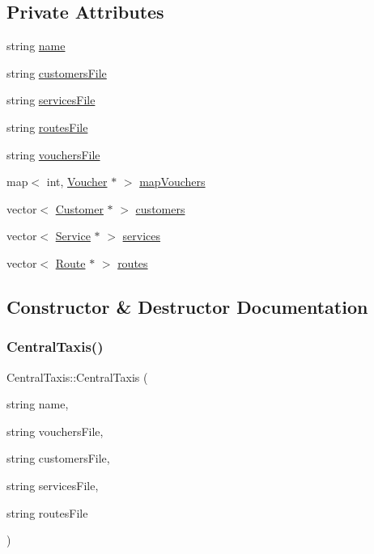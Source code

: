 \subsection*{Private Attributes}
\begin{DoxyCompactItemize}
\item 
string \hyperlink{classCentralTaxis_ab651d92a544bb7910586183aef0b5ff6}{name}
\item 
string \hyperlink{classCentralTaxis_a658c8ac7923a5f759da1545a21416532}{customers\+File}
\item 
string \hyperlink{classCentralTaxis_a0c57e6ffde520f8145edd96eb0e1fe22}{services\+File}
\item 
string \hyperlink{classCentralTaxis_af411ccf9a02306f4fb6343607ad9b751}{routes\+File}
\item 
string \hyperlink{classCentralTaxis_a6b4866b7ea58f6672dfab0677cc7a3ed}{vouchers\+File}
\item 
map$<$ int, \hyperlink{classVoucher}{Voucher} $\ast$ $>$ \hyperlink{classCentralTaxis_a3213a25703a7791fda679f93de0ff652}{map\+Vouchers}
\item 
vector$<$ \hyperlink{classCustomer}{Customer} $\ast$ $>$ \hyperlink{classCentralTaxis_a5418c7eb3c09a2037e4802630c53f5ee}{customers}
\item 
vector$<$ \hyperlink{classService}{Service} $\ast$ $>$ \hyperlink{classCentralTaxis_af5c916262a876770f184a31fff7203e5}{services}
\item 
vector$<$ \hyperlink{classRoute}{Route} $\ast$ $>$ \hyperlink{classCentralTaxis_aefebf92c6b447639524856f919b8736f}{routes}
\end{DoxyCompactItemize}


\subsection{Constructor \& Destructor Documentation}
\hypertarget{classCentralTaxis_aca0cca3a2df44dadf8bfcb71b3636739}{}\label{classCentralTaxis_aca0cca3a2df44dadf8bfcb71b3636739} 
\subsubsection{\texorpdfstring{Central\+Taxis()}{CentralTaxis()}}
{\footnotesize\ttfamily Central\+Taxis\+::\+Central\+Taxis (\begin{DoxyParamCaption}\item[{string}]{name,  }\item[{string}]{vouchers\+File,  }\item[{string}]{customers\+File,  }\item[{string}]{services\+File,  }\item[{string}]{routes\+File }\end{DoxyParamCaption})}

